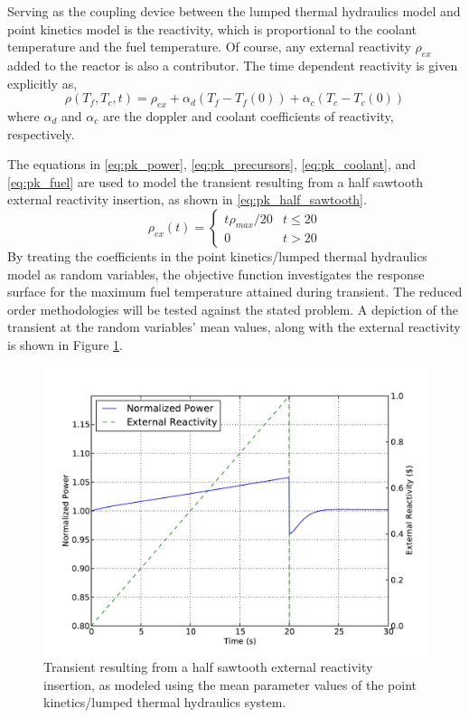 Serving as the coupling device between the lumped thermal hydraulics model and point kinetics model is the reactivity, which is proportional to the coolant temperature and the fuel temperature. Of course, any external reactivity $\rho_{ex}$ added to the reactor is also a contributor. The time dependent reactivity is given explicitly as,
\begin{equation}
\label{eq:pk_reactivity}
   \rho(T_f,T_c,t) = \rho_{ex} + \alpha_d(T_f - T_f(0))
    + \alpha_c(T_c - T_c(0))
\end{equation}
where $\alpha_d$ and $\alpha_c$ are the doppler and coolant coefficients of reactivity, respectively.  

The equations in \ref{eq:pk_power}, \ref{eq:pk_precursors}, \ref{eq:pk_coolant}, and \ref{eq:pk_fuel} are used to model the transient resulting from a half sawtooth external reactivity insertion, as shown in \ref{eq:pk_half_sawtooth}. 
\begin{equation}
\label{eq:pk_half_sawtooth}
   \rho_{ex}(t) = \left\{
    \begin{array}{cr}
     t\rho_{max}/20 & t \leq 20 \\
     0                      & t > 20 
    \end{array}
    \right.
\end{equation}
By treating the coefficients in the point kinetics/lumped thermal hydraulics model as random variables, the objective function investigates the response surface for the maximum fuel temperature attained during transient. The reduced order methodologies will be tested against the stated problem. A depiction of the transient at the random variables' mean values, along with the external reactivity is shown in Figure \ref{fig:pk_transient}.  
\begin{figure}
\caption{ \label{fig:pk_transient}
Transient resulting from a half sawtooth external reactivity insertion, as modeled using the mean parameter values of the point kinetics/lumped thermal hydraulics system.}
 \begin{center}
  \includegraphics[scale=.75]{./Chapter3/pk_power.pdf}
 \end{center}
\end{figure}
